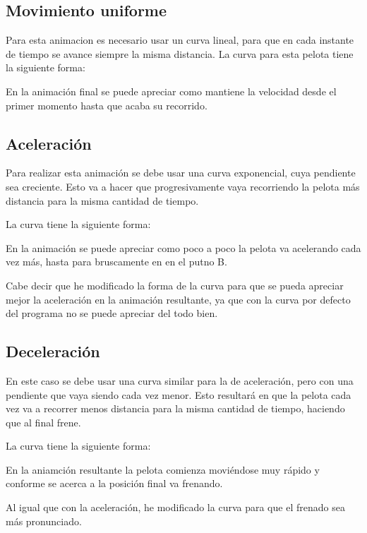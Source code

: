 \documentclass{article}
\begin{document}
\subsection{Movimiento uniforme}

Para esta animacion es necesario usar un curva lineal, para que en cada instante de tiempo se avance siempre la misma distancia. La curva para esta pelota tiene la siguiente forma:


En la animación final se puede apreciar como mantiene la velocidad desde el primer momento hasta que acaba su recorrido.

\subsection{Aceleración}

Para realizar esta animación se debe usar una curva exponencial, cuya pendiente sea creciente. Esto va a hacer que progresivamente vaya recorriendo la pelota más distancia para la misma cantidad de tiempo. 

La curva tiene la siguiente forma:


En la animación se puede apreciar como poco a poco la pelota va acelerando cada vez más, hasta para bruscamente en en el putno B.

Cabe decir que he modificado la forma de la curva para que se pueda apreciar mejor la aceleración en la animación resultante, ya que con la curva por defecto del programa no se puede apreciar del todo bien.

\subsection{Deceleración}

En este caso se debe usar una curva similar para la de aceleración, pero con una pendiente que vaya siendo cada vez menor. Esto resultará en que la pelota cada vez va a recorrer menos distancia para la misma cantidad de tiempo, haciendo que al final frene.

La curva tiene la siguiente forma:


En la aniamción resultante la pelota comienza moviéndose muy rápido y conforme se acerca a la posición final va frenando.

Al igual que con la aceleración, he modificado la curva para que el frenado sea más pronunciado.
\end{document}
